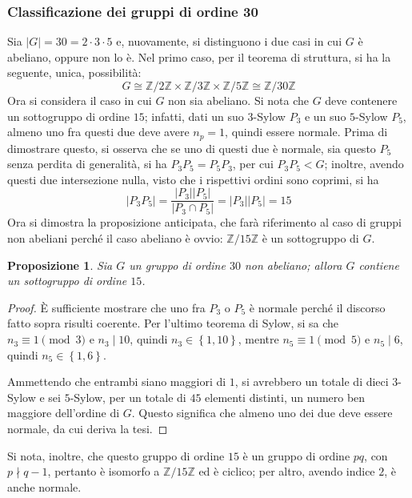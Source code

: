 \documentclass[12pt]{scrartcl}
\theoremstyle{style}
\newtheorem{prop}{Proposizione}[section]
\numberwithin{equation}{subsection}
\begin{document}
\subsubsection{Classificazione dei gruppi di ordine 30}
Sia $\lvert G \rvert  = 30 = 2\cdot 3\cdot 5$ e, nuovamente, si distinguono i due casi in cui $G$ \`e abeliano, oppure non lo \`e.
Nel primo caso, per il teorema di struttura, si ha la seguente, unica, possibilit\`a:
\[
G \cong \mathbb{Z}/2\mathbb{Z}\times  \mathbb{Z}/3\mathbb{Z}\times \mathbb{Z}/5\mathbb{Z} \cong \mathbb{Z}/30\mathbb{Z}
\] 
Ora si considera il caso in cui $G$ non sia abeliano.
Si nota che $G$ deve contenere un sottogruppo di ordine $15$; infatti, dati un suo $3$-Sylow $P_3$ e un suo $5$-Sylow $P_5$, almeno uno fra questi due deve avere $n_p =1$, quindi essere normale.
Prima di dimostrare questo, si osserva che se uno di questi due \`e normale, sia questo $P_5$ senza perdita di generalit\`a, si ha $P_3P_5=P_5P_3$, per cui $P_3P_5 < G$; inoltre, avendo questi due intersezione nulla, visto che i rispettivi ordini sono coprimi, si ha 
\[
\lvert P_3P_5 \rvert = \frac{\lvert P_3 \rvert \lvert P_5 \rvert }{\lvert P_3\cap P_5 \rvert } = \lvert P_3 \rvert \lvert P_5 \rvert =15
\] 
Ora si dimostra la proposizione anticipata, che far\`a riferimento al caso di gruppi non abeliani perch\'e il caso abeliano \`e ovvio: $\mathbb{Z}/15\mathbb{Z}$ \`e un sottogruppo di $G$.
\begin{prop}
	Sia $G$ un gruppo di ordine $30$ non abeliano; allora $G$ contiene un sottogruppo di ordine $15$.
\end{prop}
	\begin{proof}
		\`E sufficiente mostrare che uno fra $P_3$ o $P_5$ \`e normale perch\'e il discorso fatto sopra risulti coerente.
		Per l'ultimo teorema di Sylow, si sa che $n_3 \equiv 1 \pmod{3} $ e $n_3  \mid 10$, quindi $n_3 \in \left\{ 1,10 \right\} $, mentre $n_5 \equiv 1 \pmod{5} $ e $n_5  \mid 6$, quindi $n_5 \in \left\{ 1,6 \right\} $.

		Ammettendo che entrambi siano maggiori di $1$, si avrebbero un totale di dieci $3$-Sylow e sei $5$-Sylow, per un totale di $45$ elementi distinti, un numero ben maggiore dell'ordine di $G$.
		Questo significa che almeno uno dei due deve essere normale, da cui deriva la tesi.
	\end{proof}
\noindent Si nota, inoltre, che questo gruppo di ordine $15$ \`e un gruppo di ordine $pq$, con $p \nmid q-1$, pertanto \`e isomorfo a $\mathbb{Z}/15\mathbb{Z}$ ed \`e ciclico; per altro, avendo indice $2$, \`e anche normale.
\end{document}
